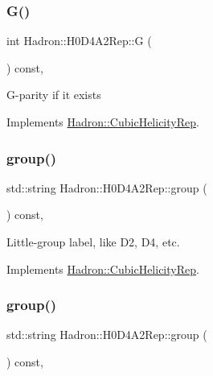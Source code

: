\subsubsection{\texorpdfstring{G()}{G()}\hspace{0.1cm}{\footnotesize\ttfamily [3/3]}}
{\footnotesize\ttfamily int Hadron\+::\+H0\+D4\+A2\+Rep\+::G (\begin{DoxyParamCaption}{ }\end{DoxyParamCaption}) const\hspace{0.3cm}{\ttfamily [inline]}, {\ttfamily [virtual]}}

G-\/parity if it exists 

Implements \mbox{\hyperlink{structHadron_1_1CubicHelicityRep_a50689f42be1e6170aa8cf6ad0597018b}{Hadron\+::\+Cubic\+Helicity\+Rep}}.

\mbox{\label{structHadron_1_1H0D4A2Rep_a9bffbf0884c199fda3b8b85c4f43e333}} 
\subsubsection{\texorpdfstring{group()}{group()}\hspace{0.1cm}{\footnotesize\ttfamily [1/5]}}
{\footnotesize\ttfamily std\+::string Hadron\+::\+H0\+D4\+A2\+Rep\+::group (\begin{DoxyParamCaption}{ }\end{DoxyParamCaption}) const\hspace{0.3cm}{\ttfamily [inline]}, {\ttfamily [virtual]}}

Little-\/group label, like D2, D4, etc. 

Implements \mbox{\hyperlink{structHadron_1_1CubicHelicityRep_a101a7d76cd8ccdad0f272db44b766113}{Hadron\+::\+Cubic\+Helicity\+Rep}}.

\mbox{\label{structHadron_1_1H0D4A2Rep_a9bffbf0884c199fda3b8b85c4f43e333}} 
\subsubsection{\texorpdfstring{group()}{group()}\hspace{0.1cm}{\footnotesize\ttfamily [2/5]}}
{\footnotesize\ttfamily std\+::string Hadron\+::\+H0\+D4\+A2\+Rep\+::group (\begin{DoxyParamCaption}{ }\end{DoxyParamCaption}) const\hspace{0.3cm}{\ttfamily [inline]}, {\ttfamily [virtual]}}

